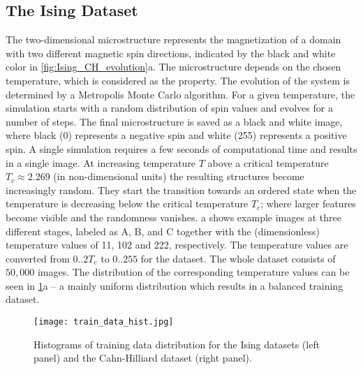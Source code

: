 \documentclass[11pt, authoryear]{elsarticle}
\begin{document}
	
	\subsection{The Ising Dataset}
	The two-dimensional microstructure represents the magnetization of a domain 
	with two different magnetic spin directions, indicated by the 
	black and white color in \cref{fig:Ising_CH_evolution}a. 
	The microstructure depends on the chosen temperature, which is considered as 
	the property. The evolution of the system is determined by a Metropolis Monte 
	Carlo algorithm. For a given temperature, the simulation starts with a random 
	distribution of spin values and evolves for a number of steps. The final 
	microstructure is saved as a black and white image, where black (0) represents 
	a negative spin and white (255) represents a positive spin. A single simulation 
	requires a few seconds of computational time and results in a single image.
	At increasing temperature $T$ above a critical temperature $T_c\approx 2.269$ 
	(in non-dimensional units) the resulting structures become increasingly random.
	They start the transition towards an ordered state when the temperature is 
	decreasing below the critical temperature $T_c$;  where larger features
	become visible and the randomness vanishes. 
	a shows example images at three different stages,
	labeled as A, B, and C together with  the (dimensionless) temperature values of 
	\SI{11}{}, \SI{102}{} and \SI{222}{}, respectively. The temperature values are 
	converted from $0..2T_c$ to $0..255$ for the dataset. The whole dataset 
	consists of $50,000$ images. The distribution of the corresponding 
	temperature values can be seen in \cref{fig:train_data_hist}a -- 
	a mainly uniform distribution which results in a balanced training 
	dataset.
	
	\begin{figure}[ht]
		\centering
		\texttt{[image: train\_data\_hist.jpg]}
		\caption[]{%
			Histograms of training data distribution for the Ising datasets (left 
			panel) and the Cahn-Hilliard dataset (right panel).
		}	
		\label{fig:train_data_hist}
	\end{figure}
	
	
\end{document}
